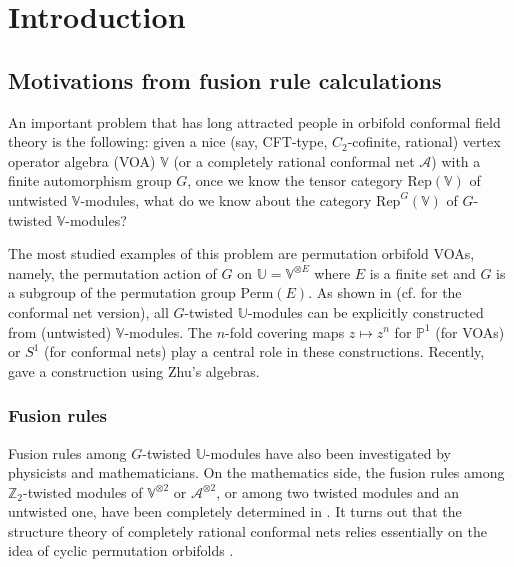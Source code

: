 \documentclass[12pt,a4paper,notitlepage]{article}
\theoremstyle{definition}
\theoremstyle{plain}
\newcommand{\mc}{\mathcal}
\newcommand{\Rep}{\mathrm{Rep}}
\newcommand{\Vbb}{\mathbb V}
\newcommand{\Ubb}{\mathbb U}
\newcommand{\Zbb}{\mathbb Z}
\newcommand{\Pbb}{\mathbb P}
\newcommand{\Perm}{\mathrm{Perm}}
\numberwithin{equation}{subsection}
\begin{document}
	
\newpage




\section{Introduction}

\subsection{Motivations from fusion rule calculations}
An important problem that has long attracted people in orbifold conformal field theory is the following: given a nice (say, CFT-type, $C_2$-cofinite,  rational) vertex operator algebra (VOA) $\Vbb$ (or a completely rational conformal net $\mc A$) with a finite automorphism group $G$, once we know the tensor category $\Rep(\Vbb)$ of untwisted $\Vbb$-modules, what do we know about   the category $\Rep^G(\Vbb)$ of $G$-twisted $\Vbb$-modules?

The most studied examples of this problem are permutation orbifold VOAs, namely, the permutation action of $G$ on $\Ubb=\Vbb^{\otimes E}$ where $E$ is a finite set and $G$ is a subgroup of the permutation group $\Perm(E)$. As shown in \cite{BHS98,BDM02} (cf. \cite{LX04,KLX05} for the conformal net version), all $G$-twisted $\Ubb$-modules can be explicitly constructed from (untwisted) $\Vbb$-modules. The $n$-fold covering maps $z\mapsto z^n$ for $\Pbb^1$ (for VOAs) or $S^1$ (for conformal nets) play a central role in these constructions. Recently, \cite{DXY21} gave a construction using Zhu's algebras. 


\subsubsection*{Fusion rules}

Fusion rules among $G$-twisted $\Ubb$-modules have also been investigated by physicists \cite{BHS98,Ban98,Ban02} and mathematicians. On the mathematics side, the fusion rules among $\Zbb_2$-twisted modules of $\Vbb^{\otimes 2}$ or $\mc A^{\otimes 2}$, or among two twisted modules and an untwisted one, have been completely determined in \cite{LX04,KLX05,DLXY19}. It turns out that the structure theory of completely rational conformal nets relies essentially on the idea of  cyclic permutation orbifolds \cite{KLM01,LX04}.
\end{document}
